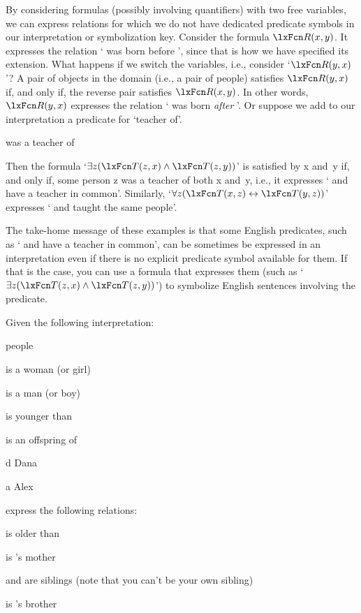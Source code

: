 By considering formulas (possibly involving quantifiers) with two free
variables, we can express relations for which we do not have dedicated
predicate symbols in our interpretation or symbolization key. Consider
the formula $\atom{R}{x,y}$. It expresses the relation ` was
born before ', since that is how we have specified its
extension. What happens if we switch the variables, i.e., consider
`$\atom{R}{y,x}$'?  A pair of objects  in
the domain (i.e., a pair of people) satisfies $\atom{R}{y,x}$ if, and only if,
the reverse pair  satisfies
$\atom{R}{x,y}$. In other words, $\atom{R}{y,x}$ expresses the
relation ` was born \emph{after} '. Or suppose we add to
our interpretation a predicate for `teacher of'.
\begin{ekey}
	\item[\atom{T}{x,y}]  was a teacher of 
\end{ekey}
Then the formula `$\exists z(\atom{T}{z,x} \land \atom{T}{z,y})$' is
satisfied by x and~y if, and only if, some person z was a teacher of
both x and~y, i.e., it expresses ` and  have a teacher
in common'. Similarly, `$\forall z(\atom{T}{x,z} \eiff \atom{T}{y,
z})$' expresses ` and  taught the same people'.

The take-home message of these examples is that some English
predicates, such as ` and  have a teacher in common',
can be sometimes be expressed in an interpretation even if there is no
explicit predicate symbol available for them. If that is the case, you
can use a formula that expresses them (such as `$\exists
z(\atom{T}{z,x} \land \atom{T}{z,y})$') to symbolize English sentences
involving the predicate.

\practiceproblems

\problempart
Given the following interpretation:
\begin{ekey}
	\item[\text{domain}] people
	\item[\atom{W}{x}]  is a woman (or girl)
	\item[\atom{M}{x}]  is a man (or boy)
	\item[\atom{Y}{x,y}]  is younger than 
	\item[\atom{O}{x,y}]  is an offspring of 
	\item[d] Dana
	\item[a] Alex
\end{ekey}
express the following relations:
\begin{compactlist}
	\item {} is older than 
	\item {} is 's mother
	\item {} and  are siblings (note that you can't be your
	own sibling)
	\item {} is 's brother
\end{compactlist}

